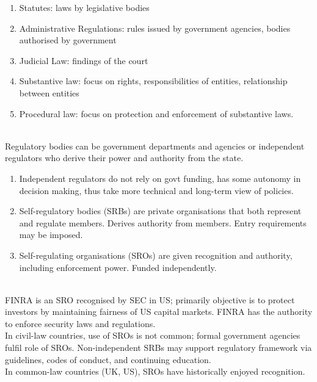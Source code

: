 \begin{definition} 
\begin{enumerate}[label=\roman*.]
\setlength{\itemsep}{0pt}
\item Statutes: laws by legislative bodies
\item Administrative Regulations: rules issued by government agencies, bodies authorised by government
\item Judicial Law: findings of the court
\item Substantive law: focus on rights, responsibilities of entities, relationship between entities
\item Procedural law: focus on protection and enforcement of substantive laws.
\end{enumerate}
\end{definition}

\begin{definition} \\
Regulatory bodies can be government departments and agencies or independent regulators who derive their power and authority from the state.
\begin{enumerate}[label=\roman*.]
\setlength{\itemsep}{0pt}
\item Independent regulators do not rely on govt funding, has some autonomy in decision making, thus take more technical and long-term view of policies.
\item Self-regulatory bodies (SRBs) are private organisations that both represent and regulate members. Derives authority from members. Entry requirements may be imposed.
\item Self-regulating organisations (SROs) are given recognition and authority, including enforcement power. Funded independently.
\end{enumerate}
\end{definition}

\begin{remark} \\
FINRA is an SRO recognised by SEC in US; primarily objective is to protect investors by maintaining fairness of US capital markets. FINRA has the authority to enforce security laws and regulations.\\
In civil-law countries, use of SROs is not common; formal government agencies fulfil role of SROs. Non-independent SRBs may support regulatory framework via guidelines, codes of conduct, and continuing education.\\
In common-law countries (UK, US), SROs have historically enjoyed recognition.
\end{remark}

